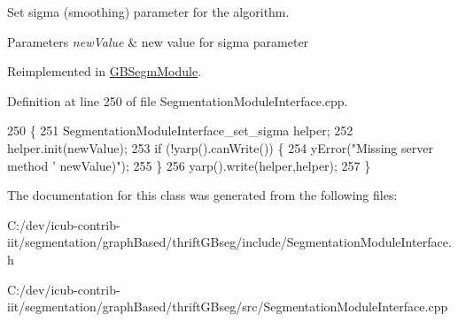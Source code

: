 Set sigma (smoothing) parameter for the algorithm. 


\begin{DoxyParams}{Parameters}
{\em new\+Value} & new value for sigma parameter \\
\hline
\end{DoxyParams}


Reimplemented in \hyperlink{classGBSegmModule_a27ffe08d394d321d9f9441423d36ef5e}{G\+B\+Segm\+Module}.



Definition at line 250 of file Segmentation\+Module\+Interface.\+cpp.


\begin{DoxyCode}
250                                                                  \{
251   SegmentationModuleInterface\_set\_sigma helper;
252   helper.init(newValue);
253   \textcolor{keywordflow}{if} (!yarp().canWrite()) \{
254     yError(\textcolor{stringliteral}{"Missing server method '%
       newValue)"});
255   \}
256   yarp().write(helper,helper);
257 \}
\end{DoxyCode}


The documentation for this class was generated from the following files\+:\begin{DoxyCompactItemize}
\item 
C\+:/dev/icub-\/contrib-\/iit/segmentation/graph\+Based/thrift\+G\+Bseg/include/Segmentation\+Module\+Interface.\+h\item 
C\+:/dev/icub-\/contrib-\/iit/segmentation/graph\+Based/thrift\+G\+Bseg/src/Segmentation\+Module\+Interface.\+cpp\end{DoxyCompactItemize}
